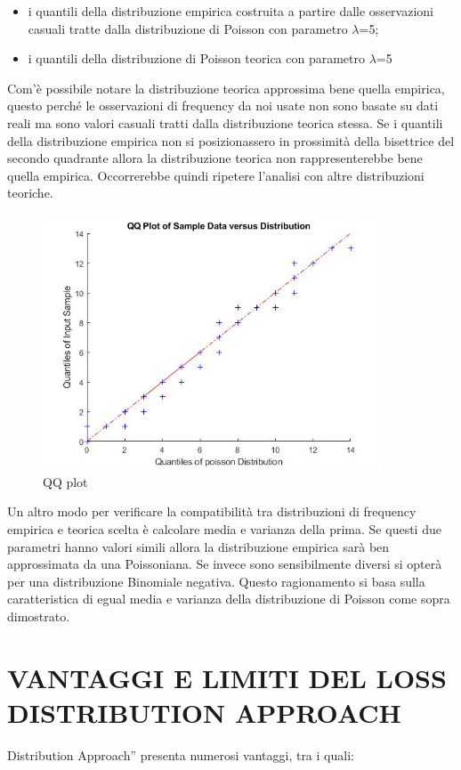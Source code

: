 \documentclass[titlepage]{article}
\begin{document}
\begin{itemize}
{\begin{itemize}
	\item i quantili della distribuzione empirica costruita a partire dalle osservazioni casuali tratte dalla distribuzione di Poisson con parametro $\lambda$=5;
	\item 	i quantili della distribuzione di Poisson teorica con parametro $\lambda$=5
\end{itemize}
Com’è possibile notare la distribuzione teorica approssima bene quella empirica, questo perché le osservazioni di frequency da noi usate non sono basate su dati reali ma sono valori casuali tratti dalla distribuzione teorica stessa.
Se i quantili della distribuzione empirica non si posizionassero in prossimità della bisettrice del secondo quadrante allora la distribuzione teorica non rappresenterebbe bene quella empirica. Occorrerebbe quindi ripetere l’analisi con altre distribuzioni teoriche.
\begin{figure}[htbp]
	\centering
	\includegraphics[width=0.9\textwidth]{QQPLOT.jpg}
	\caption{\label{fig:losss.png}QQ plot}
\end{figure}
Un altro modo per verificare la compatibilità tra distribuzioni di frequency empirica e teorica scelta è calcolare media e varianza della prima. Se questi due parametri hanno valori simili allora la distribuzione empirica sarà ben approssimata da una Poissoniana. Se invece sono sensibilmente diversi si opterà per una distribuzione Binomiale negativa. Questo ragionamento si basa sulla caratteristica di egual media e varianza della distribuzione di Poisson come sopra dimostrato.
\newpage
\newpage
\section{VANTAGGI E LIMITI DEL LOSS DISTRIBUTION APPROACH}
Distribution Approach” presenta numerosi vantaggi, tra i quali: 
\begin{itemize}



\end{itemize}}
\end{itemize}
\end{document}
